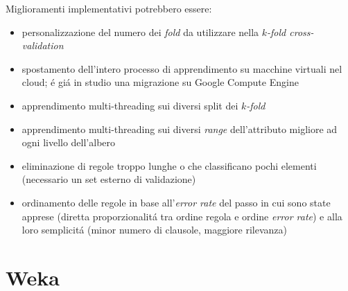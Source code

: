 \documentclass[preprint]{acm_proc_article-sp}
\begin{document}
Miglioramenti implementativi potrebbero essere:
\begin{itemize}
\item personalizzazione del numero dei \textit{fold} da utilizzare nella $k$\textit{-fold cross-validation}
\item spostamento dell'intero processo di apprendimento su macchine virtuali nel cloud; \'e gi\'a in studio una migrazione su Google Compute Engine
\item apprendimento multi-threading sui diversi split dei $k$\textit{-fold}
\item apprendimento multi-threading sui diversi \textit{range} dell'attributo migliore ad ogni livello dell'albero 
\item eliminazione di regole troppo lunghe o che classificano pochi elementi (necessario un set esterno di validazione)
\item ordinamento delle regole in base all'\textit{error rate} del passo in cui sono state apprese (diretta proporzionalit\'a tra ordine regola e ordine \textit{error rate}) e alla loro semplicit\'a (minor numero di clausole, maggiore rilevanza)
\end{itemize}



\appendix

\section{Weka}
\label{appendix-weka}

\balancecolumns

\end{document}
